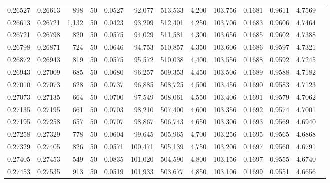 \begin{tabular}{rrrrrrrrrrrrr}
0.26527 & 0.26613 &   898 &  50 &                                     0.0527 &  92,077 & 513,533 &   4,200 & 103,756 & 0.1681 & 0.9611 & 4.7569 \\
0.26613 & 0.26721 & 1,132 &  50 &                                     0.0423 &  93,209 & 512,401 &   4,250 & 103,706 & 0.1683 & 0.9606 & 4.7464 \\
0.26721 & 0.26798 &   820 &  50 &                                     0.0575 &  94,029 & 511,581 &   4,300 & 103,656 & 0.1685 & 0.9602 & 4.7388 \\
0.26798 & 0.26871 &   724 &  50 &                                     0.0646 &  94,753 & 510,857 &   4,350 & 103,606 & 0.1686 & 0.9597 & 4.7321 \\
0.26872 & 0.26943 &   819 &  50 &                                     0.0575 &  95,572 & 510,038 &   4,400 & 103,556 & 0.1688 & 0.9592 & 4.7245 \\
0.26943 & 0.27009 &   685 &  50 &                                     0.0680 &  96,257 & 509,353 &   4,450 & 103,506 & 0.1689 & 0.9588 & 4.7182 \\
0.27010 & 0.27073 &   628 &  50 &                                     0.0737 &  96,885 & 508,725 &   4,500 & 103,456 & 0.1690 & 0.9583 & 4.7123 \\
0.27073 & 0.27135 &   664 &  50 &                                     0.0700 &  97,549 & 508,061 &   4,550 & 103,406 & 0.1691 & 0.9579 & 4.7062 \\
0.27135 & 0.27195 &   661 &  50 &                                     0.0703 &  98,210 & 507,400 &   4,600 & 103,356 & 0.1692 & 0.9574 & 4.7001 \\
0.27195 & 0.27258 &   657 &  50 &                                     0.0707 &  98,867 & 506,743 &   4,650 & 103,306 & 0.1693 & 0.9569 & 4.6940 \\
0.27258 & 0.27329 &   778 &  50 &                                     0.0604 &  99,645 & 505,965 &   4,700 & 103,256 & 0.1695 & 0.9565 & 4.6868 \\
0.27329 & 0.27405 &   826 &  50 &                                     0.0571 & 100,471 & 505,139 &   4,750 & 103,206 & 0.1697 & 0.9560 & 4.6791 \\
0.27405 & 0.27453 &   549 &  50 &                                     0.0835 & 101,020 & 504,590 &   4,800 & 103,156 & 0.1697 & 0.9555 & 4.6740 \\
0.27453 & 0.27535 &   913 &  50 &                                     0.0519 & 101,933 & 503,677 &   4,850 & 103,106 & 0.1699 & 0.9551 & 4.6656 \\

\end{tabular}
